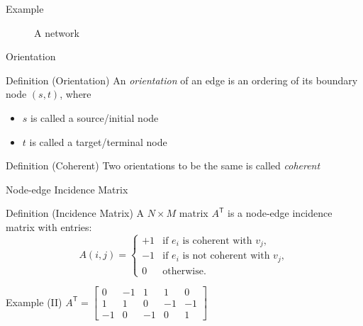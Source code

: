 \documentclass[
  ignorenonframetext,
]{beamer}
\providecommand{\tightlist}{%
  \setlength{\itemsep}{0pt}\setlength{\parskip}{0pt}}
\begin{document}
\begin{frame}{Example}
\protect\hypertarget{example}{}
\begin{figure}[hp]
\centering

\caption{A network}%
\label{fig:network}
\end{figure}
\end{frame}

\begin{frame}{Orientation}
\protect\hypertarget{orientation}{}
\begin{block}{Definition (Orientation)}
\protect\hypertarget{definition-orientation}{}
An \emph{orientation} of an edge is an ordering of its boundary node
\((s, t)\), where

\begin{itemize}
\tightlist
\item
  \(s\) is called a source/initial node
\item
  \(t\) is called a target/terminal node
\end{itemize}
\end{block}

\begin{block}{Definition (Coherent)}
\protect\hypertarget{definition-coherent}{}
Two orientations to be the same is called \emph{coherent}
\end{block}
\end{frame}

\begin{frame}{Node-edge Incidence Matrix}
\protect\hypertarget{node-edge-incidence-matrix}{}
\begin{block}{Definition (Incidence Matrix)}
\protect\hypertarget{definition-incidence-matrix}{}
A \(N \times M\) matrix \(A^\mathsf{T}\) is a node-edge incidence matrix
with entries: \[A(i,j) = \begin{cases}
  +1 & \text{if $e_i$ is coherent with $v_j$}, \\  
  -1 & \text{if $e_i$ is not coherent with $v_j$}, \\  
   0 & \text{otherwise.}
  \end{cases}\]
\end{block}

\begin{block}{Example (II)}
\protect\hypertarget{example-ii}{}
\(A^\mathsf{T} = \begin{bmatrix} 0 & -1 & 1 & 1 & 0 \\ 1 & 1 & 0 & -1 & -1 \\ -1 & 0 & -1 & 0 & 1 \end{bmatrix}\)
\end{block}
\end{frame}
\end{document}
